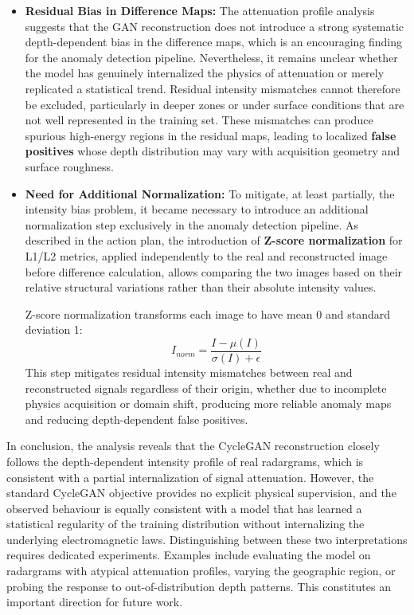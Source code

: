 \begin{itemize}
    \item \textbf{Residual Bias in Difference Maps:} The attenuation profile analysis suggests that the GAN reconstruction does not introduce a strong systematic depth-dependent bias in the difference maps, which is an encouraging finding for the anomaly detection pipeline. Nevertheless, it remains unclear whether the model has genuinely internalized the physics of attenuation or merely replicated a statistical trend. Residual intensity mismatches cannot therefore be excluded, particularly in deeper zones or under surface conditions that are not well represented in the training set. These mismatches can produce spurious high-energy regions in the residual maps, leading to localized \textbf{false positives} whose depth distribution may vary with acquisition geometry and surface roughness.
    \item \textbf{Need for Additional Normalization:} To mitigate, at least partially, the intensity bias problem, it became necessary to introduce an additional normalization step exclusively in the anomaly detection pipeline. As described in the action plan, the introduction of \textbf{Z-score normalization} for L1/L2 metrics, applied independently to the real and reconstructed image before difference calculation, allows comparing the two images based on their relative structural variations rather than their absolute intensity values.
    
    Z-score normalization transforms each image to have mean 0 and standard deviation 1:
    \begin{equation}
        I_{norm} = \frac{I - \mu(I)}{\sigma(I) + \epsilon}
    \end{equation}
    This step mitigates residual intensity mismatches between real and reconstructed signals regardless of their origin, whether due to incomplete physics acquisition or domain shift, producing more reliable anomaly maps and reducing depth-dependent false positives.
\end{itemize}

In conclusion, the analysis reveals that the CycleGAN reconstruction closely follows the depth-dependent intensity profile of real radargrams, which is consistent with a partial internalization of signal attenuation.
However, the standard CycleGAN objective provides no explicit physical supervision, and the observed behaviour is equally consistent with a model that has learned a statistical regularity of the training distribution without internalizing the underlying electromagnetic laws.
Distinguishing between these two interpretations requires dedicated experiments.
Examples include evaluating the model on radargrams with atypical attenuation profiles, varying the geographic region, or probing the response to out-of-distribution depth patterns.
This constitutes an important direction for future work.

